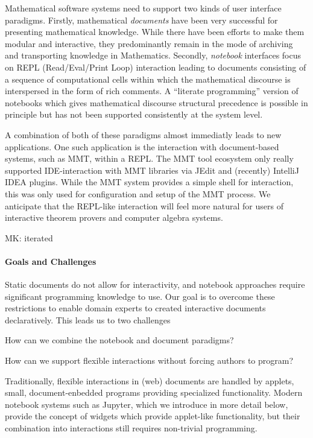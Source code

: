 Mathematical software systems need to support two kinds of user interface paradigms.
Firstly, mathematical \emph{documents} have been very successful for presenting mathematical knowledge.
While there have been efforts to make them modular and interactive, they predominantly remain in the mode of archiving and transporting knowledge in Mathematics.
Secondly, \emph{notebook} interfaces focus on REPL (Read/Eval/Print Loop) interaction leading to documents consisting of a sequence of computational cells within which the mathematical discourse is interspersed in the form of rich comments.
A ``literate programming'' version of notebooks which gives mathematical discourse structural precedence is possible in principle but has not been supported consistently at the system level.

A combination of both of these paradigms almost immediatly leads to new applications. 
One such application is the interaction with document-based systems, such as MMT, within a REPL.
The MMT tool ecosystem only really supported IDE-interaction with MMT libraries via JEdit and (recently) IntelliJ IDEA plugins. 
While the MMT system provides a simple shell for interaction, this was only used for configuration and setup of the MMT process.
We anticipate that the REPL-like interaction will feel more natural for users of interactive theorem provers and computer algebra systems.

\begin{newpart}{MK: iterated}
\paragraph{Goals and Challenges}
Static documents do not allow for interactivity, and notebook approaches require significant programming knowledge to use.
Our goal is to overcome these restrictions to enable domain experts to created interactive documents declaratively. 
This leads us to two challenges
\begin{compactenum}[\em i\rm )]
\item How can we combine the notebook and document paradigms?
\item How can we support flexible interactions without forcing authors to program?
\end{compactenum}
Traditionally, flexible interactions in (web) documents are handled by applets, small, document-enbedded programs providing specialized functionality. 
Modern notebook systems such as Jupyter, which we introduce in more detail below, provide the concept of widgets which provide applet-like functionality, but their combination into interactions still requires non-trivial programming.  
\end{newpart}

